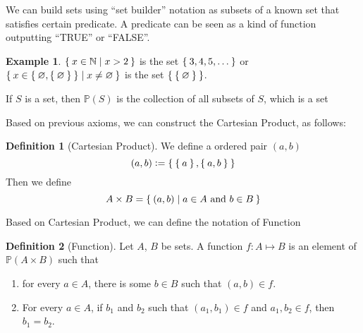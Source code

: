 \documentclass[12pt]{amsart}
\newcommand{\bbN}{\mathbb{N}}
\theoremstyle{plain}
\theoremstyle{remark}
\theoremstyle{definition}
\newtheorem*{define}{Definition}
\newtheorem*{eg}{Example}
\begin{document}
\begin{AXM}
	We can build sets using ``set builder'' notation as subsets of a known set that satisfies certain predicate. A predicate can be seen as a kind of function outputting ``TRUE'' or ``FALSE''.
\end{AXM}
\begin{eg}
	$\Set{x \in \bbN| x > 2}$ is the set $\Set{3,4,5,\dots}$ or
	\newline
	$\Set{x \in \Set{\varnothing, \Set{\varnothing}}| x \neq \varnothing}$ is the set $\Set{\Set{\varnothing}}$.
\end{eg}

\begin{AXM}
	If $S$ is a set, then $\mathbb{P}(S)$ is the collection of all subsets of $S$, which is a set	
\end{AXM}

Based on previous axioms, we can construct the Cartesian Product, as follows:
\begin{define}[Cartesian Product]
	We define a ordered pair $(a, b)$
	\begin{equation*}
		(a, b) \vcentcolon = \Set{\Set{a}, \Set{a, b}}
	\end{equation*}
	Then we define
	\begin{equation*}
		A \times B = \Set{(a,b) | a \in A \text{ and } b \in B}
	\end{equation*}
\end{define}

Based on Cartesian Product, we can define the notation of Function
\begin{define}[Function]
	Let $A$, $B$ be sets. A function $f:A \mapsto B$ is an element of $\mathbb{P}(A \times B)$ such that 
	\begin{enumerate}[(1)]
		\item for every $a \in A$, there is some $b \in B$ such that $(a, b) \in f$.
		\item For every $a \in A$, if $b_1$ and $b_2$ such that $(a_1, b_1) \in f$ and $a_1, b_2 \in f$, then $b_1 = b_2$.
	\end{enumerate}
\end{define}
\end{document}
